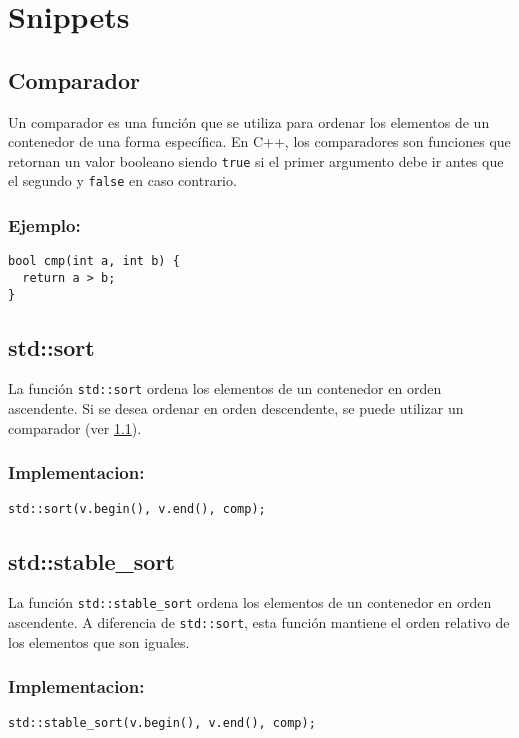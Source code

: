 \section{Snippets}

\subsection{Comparador}
\label{subsec:comparador}
Un comparador es una función que se utiliza para ordenar los elementos de un contenedor de una forma específica. En C++, los comparadores son funciones que retornan un valor booleano siendo \texttt{true} si el primer argumento debe ir antes que el segundo y \texttt{false} en caso contrario.

\subsubsection{Ejemplo:}
\begin{lstlisting}
bool cmp(int a, int b) {
  return a > b;
}
\end{lstlisting}

\subsection{std::sort}
\label{subsec:std_sort}
La función \texttt{std::sort} ordena los elementos de un contenedor en orden ascendente. Si se desea ordenar en orden descendente, se puede utilizar un comparador (ver \ref{subsec:comparador}).

\subsubsection{Implementacion:}
\begin{lstlisting}
std::sort(v.begin(), v.end(), comp);
\end{lstlisting}

\subsection{std::stable\_sort}
\label{subsec:std_stable_sort}
La función \texttt{std::stable\_sort} ordena los elementos de un contenedor en orden ascendente. A diferencia de \texttt{std::sort}, esta función mantiene el orden relativo de los elementos que son iguales.

\subsubsection{Implementacion:}
\begin{lstlisting}
std::stable_sort(v.begin(), v.end(), comp);
\end{lstlisting}

